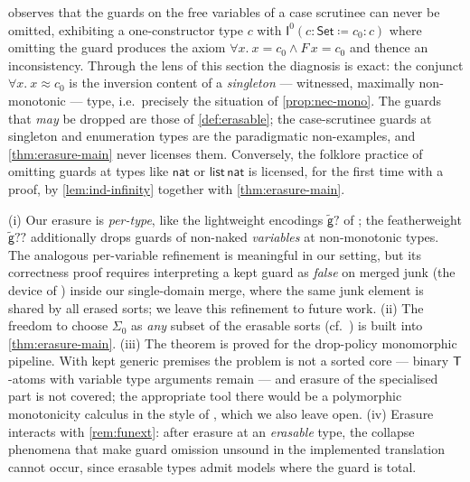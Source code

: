 \begin{remark}
\label{rem:jar-counterexample}
\cite[\S5.6]{CzajkaKaliszyk2018} observes that the guards on the
free variables of a case scrutinee can never be omitted, exhibiting
a one-constructor type $c$ with $\mathsf{I}^0(c : \mathsf{Set}
\coloneqq c_0 : c)$ where omitting the guard produces the axiom
$\forall x.\ x = c_0 \wedge F\,x = c_0$ and thence an inconsistency.
Through the lens of this section the diagnosis is exact:
the conjunct $\forall x.\ x \approx c_0$ is the inversion content
of a \emph{singleton} --- witnessed, maximally non-monotonic ---
type, i.e.\ precisely the situation of \cref{prop:nec-mono}.  The
guards that \emph{may} be dropped are those of
\cref{def:erasable}; the case-scrutinee guards at singleton and
enumeration types are the paradigmatic non-examples, and
\cref{thm:erasure-main} never licenses them.  Conversely, the
folklore practice of omitting guards at types like $\mathsf{nat}$
or $\mathsf{list}\,\mathsf{nat}$ is licensed, for the first time
with a proof, by \cref{lem:ind-infinity} together with
\cref{thm:erasure-main}.
\end{remark}

\begin{remark}
\label{rem:erasure-scope}
(i) Our erasure is \emph{per-type}, like the lightweight encodings
$\widetilde{\mathsf{g}}?$ of \cite{Claessen2011,Blanchette2016};
the featherweight $\widetilde{\mathsf{g}}??$ additionally drops
guards of non-naked \emph{variables} at non-monotonic types.  The
analogous per-variable refinement is meaningful in our setting, but
its correctness proof requires interpreting a kept guard as
\emph{false} on merged junk (the device of
\cite[Thm.~5.20]{Blanchette2016}) inside our single-domain merge,
where the same junk element is shared by all erased sorts; we leave
this refinement to future work.  (ii) The freedom to choose
$\Sigma_0$ as \emph{any} subset of the erasable sorts (cf.\
\cite[Rem.~5.21]{Blanchette2016}) is built into
\cref{thm:erasure-main}.  (iii) The theorem is proved for the
drop-policy monomorphic pipeline.  With kept generic premises the
problem is not a sorted core --- binary $\mathsf{T}$-atoms with
variable type arguments remain --- and erasure of the specialised
part is not covered; the appropriate tool there would be a
polymorphic monotonicity calculus in the style of
\cite[\S6]{Blanchette2016}, which we also leave open.
(iv) Erasure interacts with \cref{rem:funext}: after erasure at an
\emph{erasable} type, the collapse phenomena that make guard
omission unsound in the implemented translation cannot occur, since
erasable types admit models where the guard is total.
\end{remark}
